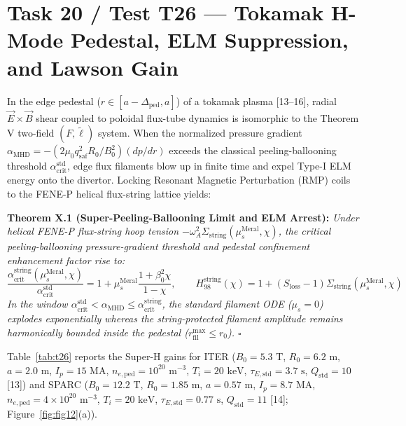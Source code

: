 \documentclass[12pt,a4paper]{article}
\begin{document}
\section{Task 20 / Test T26 --- Tokamak H-Mode Pedestal, ELM Suppression, and Lawson Gain}

In the edge pedestal ($r\in[a-\Delta_{\mathrm{ped}},a]$) of a tokamak plasma [13--16], radial $\vec{E}\times\vec{B}$ shear coupled to poloidal flux-tube dynamics is isomorphic to the Theorem V two-field $(F,\tilde{\ell})$ system. When the normalized pressure gradient $\alpha_{\mathrm{MHD}} = -(2\mu_0 q_{\mathrm{saf}}^2 R_0/B_0^2)(dp/dr)$ exceeds the classical peeling-ballooning threshold $\alpha_{\mathrm{crit}}^{\mathrm{std}}$, edge flux filaments blow up in finite time and expel Type-I ELM energy onto the divertor. Locking Resonant Magnetic Perturbation (RMP) coils to the FENE-P helical flux-string lattice yields:

\textbf{Theorem X.1 (Super-Peeling-Ballooning Limit and ELM Arrest):} \textit{Under helical FENE-P flux-string hoop tension $-\omega_A^2\Sigma_{\mathrm{string}}(\mu_s^{\mathrm{Meral}},\chi)$, the critical peeling-ballooning pressure-gradient threshold and pedestal confinement enhancement factor rise to:}
\begin{equation}
\boxed{\frac{\alpha_{\mathrm{crit}}^{\mathrm{string}}(\mu_s^{\mathrm{Meral}},\chi)}{\alpha_{\mathrm{crit}}^{\mathrm{std}}}
= 1 + \mu_s^{\mathrm{Meral}}\frac{1+\beta_0^2\chi}{1-\chi},
\qquad
H_{98}^{\mathrm{string}}(\chi)
= 1 + \left(S_{\mathrm{loss}} - 1\right)\Sigma_{\mathrm{string}}(\mu_s^{\mathrm{Meral}},\chi)}
\label{eq:t26_alpha}
\end{equation}
\textit{In the window $\alpha_{\mathrm{crit}}^{\mathrm{std}} < \alpha_{\mathrm{MHD}} \le \alpha_{\mathrm{crit}}^{\mathrm{string}}$, the standard filament ODE ($\mu_s=0$) explodes exponentially whereas the string-protected filament amplitude remains harmonically bounded inside the pedestal ($r_{\mathrm{fil}}^{\max} \le r_0$). $\square$}

Table~\ref{tab:t26} reports the Super-H gains for ITER ($B_0=5.3\text{ T}$, $R_0=6.2\text{ m}$, $a=2.0\text{ m}$, $I_p=15\text{ MA}$, $n_{e,\mathrm{ped}}=10^{20}\text{ m}^{-3}$, $T_i=20\text{ keV}$, $\tau_{E,\mathrm{std}}=3.7\text{ s}$, $Q_{\mathrm{std}}=10$ [13]) and SPARC ($B_0=12.2\text{ T}$, $R_0=1.85\text{ m}$, $a=0.57\text{ m}$, $I_p=8.7\text{ MA}$, $n_{e,\mathrm{ped}}=4\times 10^{20}\text{ m}^{-3}$, $T_i=20\text{ keV}$, $\tau_{E,\mathrm{std}}=0.77\text{ s}$, $Q_{\mathrm{std}}=11$ [14]; Figure~\ref{fig:fig12}(a)).
\end{document}
